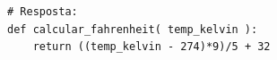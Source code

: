 \ifmostrarGabarito
\begin{verbatim}
# Resposta:
def calcular_fahrenheit( temp_kelvin ):
    return ((temp_kelvin - 274)*9)/5 + 32
\end{verbatim}
\fi
